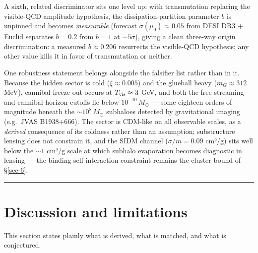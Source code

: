 \documentclass[preprint,12pt]{elsarticle}
\begin{document}
A sixth, related discriminator sits one level up: with transmutation
replacing the visible-QCD amplitude hypothesis, the
dissipation-partition parameter \(b\) is unpinned and becomes
\emph{measurable} (forecast \(\sigma(\mu_0) \approx 0.05\) from DESI DR3
+ Euclid separates \(b = 0.2\) from \(b = 1\) at \(\sim 5\sigma\)),
giving a clean three-way origin discrimination: a measured
\(b \approx 0.206\) resurrects the visible-QCD hypothesis; any other
value kills it in favor of transmutation or neither.

One robustness statement belongs alongside the falsifier list rather
than in it. Because the hidden sector is cold (\(\xi \approx 0.005\))
and the glueball heavy (\(m_G \approx 312\) MeV), cannibal freeze-out
occurs at \(T_{\rm vis} \approx 3\) GeV, and both the free-streaming and
cannibal-horizon cutoffs lie below \(10^{-10}\,M_\odot\) --- some
eighteen orders of magnitude beneath the \(\sim 10^8\,M_\odot\)
subhaloes detected by gravitational imaging (e.g.~JVAS B1938+666). The
sector is CDM-like on all observable scales, as a \emph{derived}
consequence of its coldness rather than an assumption; substructure
lensing does not constrain it, and the SIDM channel (\(\sigma/m = 0.09\)
cm²/g) sits well below the \(\sim 1\) cm²/g scale at which subhalo
evaporation becomes diagnostic in lensing --- the binding
self-interaction constraint remains the cluster bound of §\ref{sec-6}.

\begin{center}\rule{0.5\linewidth}{0.5pt}\end{center}

\section{Discussion and limitations}\label{sec-8}

This section states plainly what is derived, what is matched, and what
is conjectured.
\end{document}
